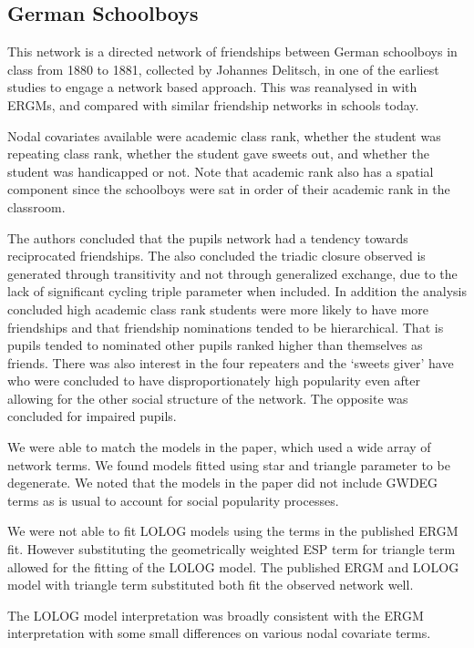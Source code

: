\documentclass[
]{statsoc}
\begin{document}
\subsection{German Schoolboys}

This network is a directed network of friendships between German
schoolboys in class from 1880 to 1881, collected by Johannes Delitsch,
in one of the earliest studies to engage a network based approach. This
was reanalysed in \cite{Heidler2014} with ERGMs, and compared with
similar friendship networks in schools today.

Nodal covariates available were academic class rank, whether the student
was repeating class rank, whether the student gave sweets out, and
whether the student was handicapped or not. Note that academic rank also
has a spatial component since the schoolboys were sat in order of their
academic rank in the classroom.

The authors concluded that the pupils network had a tendency towards
reciprocated friendships. The also concluded the triadic closure
observed is generated through transitivity and not through generalized
exchange, due to the lack of significant cycling triple parameter when
included. In addition the analysis concluded high academic class rank
students were more likely to have more friendships and that friendship
nominations tended to be hierarchical. That is pupils tended to
nominated other pupils ranked higher than themselves as friends. There
was also interest in the four repeaters and the `sweets giver' have who
were concluded to have disproportionately high popularity even after
allowing for the other social structure of the network. The opposite was
concluded for impaired pupils.

We were able to match the models in the paper, which used a wide array
of network terms. We found models fitted using star and triangle
parameter to be degenerate. We noted that the models in the paper did
not include GWDEG terms as is usual to account for social popularity
processes.

We were not able to fit LOLOG models using the terms in the published
ERGM fit. However substituting the geometrically weighted ESP term for
triangle term allowed for the fitting of the LOLOG model. The published
ERGM and LOLOG model with triangle term substituted both fit the
observed network well.

The LOLOG model interpretation was broadly consistent with the ERGM
interpretation with some small differences on various nodal covariate
terms.
\end{document}
